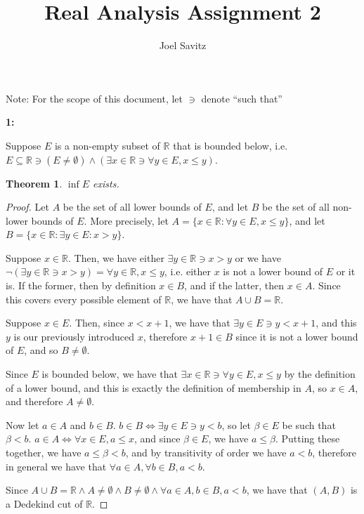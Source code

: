 \documentclass{article}
\title{Real Analysis Assignment 2}
\author{Joel Savitz}
\newcommand{\reals}{\mathbb{R}}
\newtheorem{thm}{Theorem}
\begin{document}
\maketitle

Note: For the scope of this document, let $\ni$ denote ``such that''

\textbf{1:}

Suppose $E$ is a non-empty subset of $\reals$ that is bounded below,
i.e. $E \subseteq \reals \ni (E \neq \emptyset) \land (\exists x \in \reals \ni \forall y \in E, x \le y)$.

\begin{thm} \label{thm1}
	$\inf E$ exists.
\end{thm}

\begin{proof}
	Let $A$ be the set of all lower bounds of $E$,
	and let $B$ be the set of all non-lower bounds of $E$.
	More precisely,
	let $A = \{ x \in \reals: \forall y \in E, x \le y \}$,
	and let $B = \{x \in \reals: \exists y \in E: x > y \}$.

	Suppose $x \in \reals$. Then,
	we have either $\exists y \in \reals \ni x > y$
	or we have $\neg (\exists y \in \reals \ni x > y) = \forall y \in \reals, x \le y$,
	i.e. either $x$ is not a lower bound of $E$ or it is.
	If the former, then by definition $x \in B$,
	and if the latter, then $x \in A$.
	Since this covers every possible element of $\reals$,
	we have that $A \cup B = \reals$.

	Suppose $x \in E$.
	Then, since $x < x + 1$,
	we have that $\exists y \in E \ni y < x + 1$,
	and this $y$ is our previously introduced $x$,
	therefore $x + 1 \in B$ since it is not a lower bound of $E$,
	and so $B \neq \emptyset$.

	Since $E$ is bounded below,
	we have that $\exists x \in \reals \ni \forall y \in E, x \le y$
	by the definition of a lower bound,
	and this is exactly the definition of membership in $A$, so $x \in A$,
	and therefore $A \neq \emptyset$.

	Now let $a \in A$ and $b \in B$.
	$b \in B \iff \exists y \in E \ni y < b$,
	so let $\beta \in E$ be such that $\beta < b$.
	$a \in A \iff \forall x \in E, a \le x$,
	and since $\beta \in E$, we have $a \le \beta$.
	Putting these together, we have $a \le \beta < b$,
	and by transitivity of order we have $a < b$,
	therefore in general we have that
	$\forall a \in A, \forall b \in B, a < b$.

	Since $A \cup B = \reals \land A \neq \emptyset \land B \neq \emptyset \land
	\forall a \in A, b \in B, a < b$,
	we have that $(A,B)$ is a Dedekind cut of $\reals$.


\end{proof}
\end{document}
